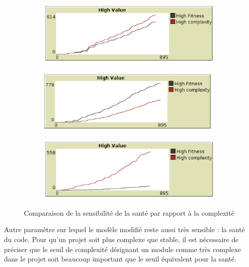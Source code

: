 \documentclass{article}
\begin{document}

\begin{figure}[H]

  \begin{subfigure}{.5\textwidth}
    \centering
    \includegraphics[width=1\linewidth]{pictures/seuil5_complexite_fitness.png}
  \end{subfigure}
  \begin{subfigure}{.5\textwidth}
    \centering
    \includegraphics[width=1\linewidth]{pictures/seuil_complexite10_fitness5.png}
  \end{subfigure}
  \begin{subfigure}{.5\textwidth}
    \centering
    \includegraphics[width=1\linewidth]{pictures/seuil_complexite5_fitness8.png}
  \end{subfigure}

  \caption{Comparaison de la sensibilité de la santé par rapport à la complexité}
\end{figure}
Autre paramètre sur lequel le modèle modifié reste aussi très sensible : la santé du code. Pour qu'un projet soit plus complexe que stable, il est nécessaire de préciser
que le seuil de complexité désignant un module comme très complexe dans le projet soit beaucoup important que le seuil équivalent pour la santé.
\end{document}
